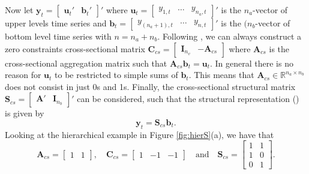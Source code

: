 \documentclass[a4paper,11pt]{article}
\newcommand{\bvet}{\bm{b}}
\newcommand{\uvet}{\bm{u}}
\newcommand{\yvet}{\bm{y}}
\newcommand{\Avet}{\bm{A}}
\newcommand{\Cvet}{\bm{C}}
\newcommand{\Ivet}{\bm{I}}
\newcommand{\Svet}{\bm{S}}
\theoremstyle{definition}
\begin{document}
Now let $\yvet_t = \begin{bmatrix}
	\uvet_t' & \bvet_t'
\end{bmatrix}'$ where $\uvet_t = \begin{bmatrix} y_{1,t} & \dots & y_{n_a,t}
\end{bmatrix}'$ is the $n_a$-vector of upper levels time series and $\bvet_t = \begin{bmatrix} y_{(n_a+1),t} & \dots & y_{n,t} \end{bmatrix}'$ is the $(n_b$-vector of bottom level time series with $n = n_a+n_b$. Following \cite{giro2022}, we can always construct a zero constraints cross-sectional matrix $\Cvet_{cs}=\begin{bmatrix}
	\Ivet_{n_v} & -\Avet_{cs}
\end{bmatrix}$ where $\Avet_{cs}$ is the cross-sectional aggregation matrix such that $\Avet_{cs}\bvet_t = \uvet_t$. In general there is no reason for $\uvet_t$ to be restricted to simple sums of $\bvet_t$. This means that $\Avet_{cs} \in \mathbb{R}^{n_a\times n_b}$ does not consist in just 0s and 1s. Finally, the cross-sectional structural matrix $\Svet_{cs} = \begin{bmatrix}\Avet' & \Ivet_{n_b}\end{bmatrix}'$ can be considered, such that the structural representation (\citealp{hyndman2011}) is given by
$$
\yvet_t = \Svet_{cs} \bvet_t.
$$
Looking at the hierarchical example in Figure \ref{fig:hierS}(a), we have that
$$
\Avet_{cs} = \begin{bmatrix} 1 & 1 \end{bmatrix}, \quad \Cvet_{cs} = \begin{bmatrix}1 & -1 & -1 \end{bmatrix} \quad \text{and} \quad \Svet_{cs} = \begin{bmatrix}
1 & 1 \\
1 & 0 \\
0 & 1
\end{bmatrix}.
$$


\end{document}
